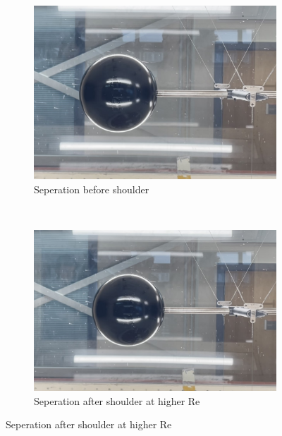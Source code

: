 \documentclass[8pt]{article}
\begin{document}
\begin{figure}[H]
    \centering
    \begin{subfigure}[t]{0.48\textwidth}
        \centering
        \includegraphics[width=1\textwidth]{Images_Videos/early_seperation.jpg}
        \caption{Seperation before shoulder}
        \label{fig:figure2}
    \end{subfigure}
    ~
    \begin{subfigure}[t]{0.48\textwidth}
        \centering
        \includegraphics[width=1\textwidth]{Images_Videos/late_seperation.jpg}
        \caption{Seperation after shoulder at higher Re}
        \label{fig:figure3}
    \end{subfigure}
\end{figure}
\end{document}

